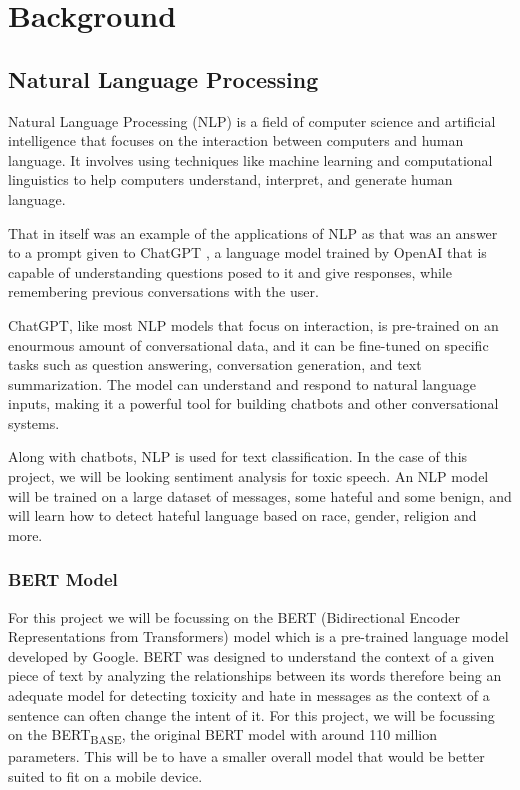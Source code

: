 \chapter{Background}

\section{Natural Language Processing}

Natural Language Processing (NLP) is a field of computer science and artificial intelligence that focuses on the interaction between computers and human language. It involves using techniques like machine learning and computational linguistics to help computers understand, interpret, and generate human language.

That in itself was an example of the applications of NLP as that was an answer to a prompt given to ChatGPT \cite{ChatGPT}, a language model trained by OpenAI that is capable of understanding questions posed to it and give responses, while remembering previous conversations with the user. 

ChatGPT, like most NLP models that focus on interaction, is pre-trained on an enourmous amount of conversational data, and it can be fine-tuned on specific tasks such as question answering, conversation generation, and text summarization. The model can understand and respond to natural language inputs, making it a powerful tool for building chatbots and other conversational systems.

Along with chatbots, NLP is used for text classification. In the case of this project, we will be looking sentiment analysis for toxic speech. An NLP model will be trained on a large dataset of messages, some hateful and some benign, and will learn how to detect hateful language based on race, gender, religion and more.

\subsection{BERT Model}

For this project we will be focussing on the BERT (Bidirectional Encoder Representations from Transformers) \cite{BERT} model which is a pre-trained language model developed by Google. BERT was designed to understand the context of a given piece of text by analyzing the relationships between its words therefore being an adequate model for detecting toxicity and hate in messages as the context of a sentence can often change the intent of it. For this project, we will be focussing on the BERT\textsubscript{BASE}, the original BERT model with around 110 million parameters. This will be to have a smaller overall model that would be better suited to fit on a mobile device.

